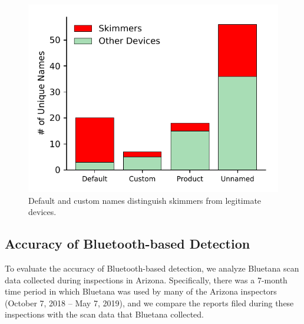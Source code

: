 \begin{figure}
    \centering
    \includegraphics[width=\linewidth]{skimmer/plots/uncat_visit_hist_device_name.pdf}
    \caption{
    \label{fig:hist_device_name}
    Default and custom names distinguish skimmers from legitimate devices.
    }
\end{figure}


%

%






\subsection{Accuracy of Bluetooth-based Detection} %

To evaluate the accuracy of Bluetooth-based detection, we analyze Bluetana scan
data collected during inspections in Arizona. Specifically, there was a 7-month
time period in which Bluetana was used by many of the Arizona inspectors
(October 7, 2018 -- May 7, 2019), and we compare the reports filed during these
inspections with the scan data that Bluetana collected.

